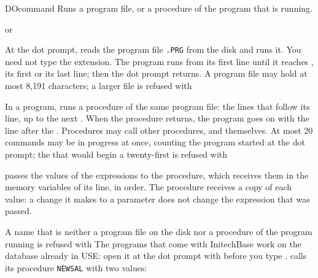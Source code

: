 \begin{XbaseEntry}{DO}{command}
Runs a program file, or a procedure of the program that is running.
\Syntax
{}
\par or\par
{}
\Usage
At the dot prompt,   reads the program file
\texttt{.PRG} from the disk and runs it.  You need not type the
extension.  The program runs from its first line until it reaches
, its first  or its last line; then the dot prompt
returns.  A program file may hold at most 8,191 characters; a larger file is
refused with 

In a program,   runs a procedure of the same program
file: the lines that follow its  line, up to the next
.  When the procedure returns, the program goes on with the line
after the .  Procedures may call other procedures, and themselves.  At
most 20  commands may be in progress at once, counting the program
started at the dot prompt; the  that would begin a twenty-first is
refused with 

 passes the values of the expressions to the procedure, which
receives them in the memory variables of its  line, in order.
The procedure receives a copy of each value: a change it makes to a parameter
does not change the expression that was passed.

A name that is neither a program file on the disk nor a procedure of the
program running is refused with 
\Tips
The programs that come with InitechBase work on the database already in USE:
open it at the dot prompt with  before you type .
\Examples
{} calls its procedure \texttt{NEWSAL} with two values:
\end{XbaseEntry}

